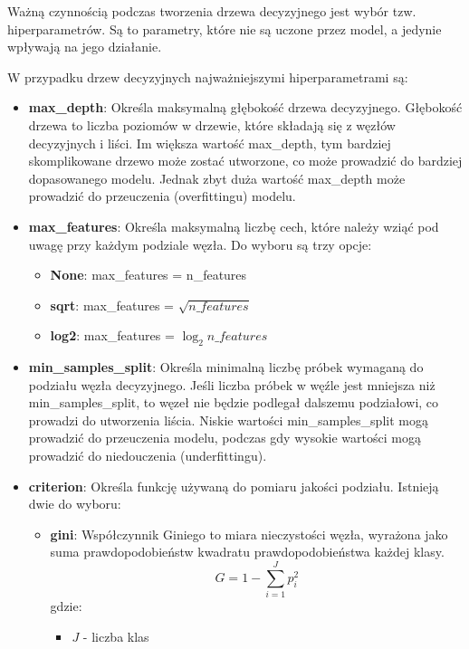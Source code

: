 \documentclass{article}
\begin{document}
Ważną czynnością podczas tworzenia drzewa decyzyjnego jest
wybór tzw. hiperparametrów. Są to parametry, które nie są
uczone przez model, a jedynie wpływają na jego działanie.

W przypadku drzew decyzyjnych najważniejszymi hiperparametrami
są:
\begin{itemize}
    \item \textbf{max\_depth}: Określa maksymalną
    głębokość drzewa decyzyjnego.
    Głębokość drzewa to liczba poziomów w
    drzewie, które składają się z węzłów
    decyzyjnych i liści. Im większa wartość
    max\_depth, tym bardziej skomplikowane
    drzewo może zostać utworzone, co może
    prowadzić do bardziej dopasowanego modelu.
    Jednak zbyt duża wartość max\_depth może
    prowadzić do przeuczenia (overfittingu) modelu.
    \item \textbf{max\_features}: Określa maksymalną
    liczbę cech, które należy wziąć pod uwagę
    przy każdym podziale węzła. Do wyboru są trzy opcje:
    \begin{itemize}
        \item \textbf{None}: max\_features = n\_features
        \item \textbf{sqrt}: max\_features = $\sqrt{n\_features}$
        \item \textbf{log2}: max\_features = $\log_2{n\_features}$
    \end{itemize}
    \item \textbf{min\_samples\_split}: Określa minimalną
    liczbę próbek wymaganą do podziału węzła decyzyjnego.
    Jeśli liczba próbek w węźle jest mniejsza niż
    min\_samples\_split, to węzeł nie będzie podlegał
    dalszemu podziałowi, co prowadzi do utworzenia
    liścia. Niskie wartości min\_samples\_split mogą
    prowadzić do przeuczenia modelu, podczas gdy
    wysokie wartości mogą prowadzić do niedouczenia (underfittingu).
    \item \textbf{criterion}: Określa funkcję używaną
    do pomiaru jakości podziału. Istnieją dwie do wyboru:
    \begin{itemize}
        \item \textbf{gini}: Współczynnik Giniego to miara
        nieczystości węzła, wyrażona jako suma prawdopodobieństw
        kwadratu prawdopodobieństwa każdej klasy.
        \begin{equation}
            G = 1 - \sum_{i=1}^{J}p_i^2
        \end{equation}
        gdzie:
        \begin{itemize}
            \item $J$ - liczba klas

\end{itemize}
\end{itemize}
\end{itemize}
\end{document}
